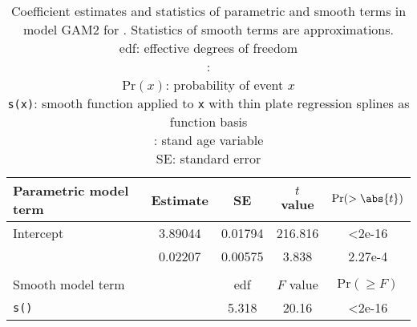 \begin{singlespace}
  \begin{table}[h]
    \caption{Coefficient estimates and statistics of parametric and smooth terms in model GAM2 for \Spruce{}.  Statistics of smooth terms are approximations. \\
      edf: effective degrees of freedom \\
      \texttt{\ProductivityIndexVariableR{}}: \ProductivityIndexVariableText{} \\
      \(\text{Pr}(x)\): probability of event \(x\) \\
      \texttt{s(x)}: smooth function applied to \texttt{x} with thin plate regression splines as function basis \\
      \texttt{\StandAgeVariableR{}}: stand age variable \\
      SE: standard error}
    \label{tab:StatisticsGAM2Spruce}
    {\tabulinesep=2mm
      \begin{tabu}{L
          S[table-format = 1.5]
          S[table-format = 1.5]
          S[table-format = 3.3]
          S[table-format = 1.2e-2, table-comparator = true]
        }
        \toprule
        Parametric model term & {Estimate} & {SE} & {\(t\) value} & {\(\text{Pr}(> \abs{t})\)} \\
        \midrule
        Intercept & 3.89044 & 0.01794 & 216.816 & <2e-16 \\
        \texttt{\ProductivityIndexVariableR{}} & 0.02207 & 0.00575 & 3.838 & 2.27e-4 \\
        \\
        Smooth model term &  & {edf} & {\(F\) value} & {\(\text{Pr}(\geq F)\)} \\
        \midrule
        \texttt{s(\StandAgeVariableR{})} & & 5.318 & 20.16 & <2e-16 \\
        \bottomrule
      \end{tabu}
    }
  \end{table}
\end{singlespace}


